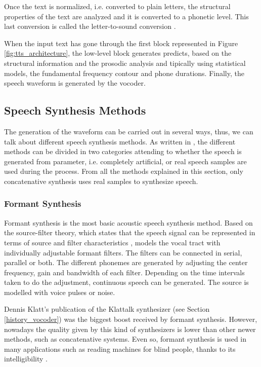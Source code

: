 Once the text is normalized, i.e. converted to plain letters, the structural properties of the text are analyzed and it is converted to a phonetic level. This last conversion is called the letter-to-sound conversion \cite{Pickett1999}. 

When the input text has gone through the first block represented in Figure \ref{fig:tts_architecture}, the low-level block generates predicts, based on the structural information and the prosodic analysis and tipically using statistical models, the fundamental frequency contour and phone durations. Finally, the speech waveform is generated by the vocoder. 

\subsection{Speech Synthesis Methods}
\label{speech_synthesis_systems_methods}
The generation of the waveform can be carried out in several ways, thus, we can talk about different speech synthesis methods. As written in \cite{TuomoMSc}, the different methods can be divided in two categories attending to whether the speech is generated from parameter, i.e. completely artificial, or real speech samples are used during the process. From all the methods explained in this section, only concatenative synthesis uses real samples to synthesize speech.

\subsubsection{Formant Synthesis}
\label{formant_speech_synthesis}
Formant synthesis is the most basic acoustic speech synthesis method. Based on the source-filter theory, which states that the speech signal can be represented in terms of source and filter characteristics \cite{Fant1970}, models the vocal tract with individually adjustable formant filters. The filters can be connected in serial, parallel or both. The different phonemes are generated by adjusting the center frequency, gain and bandwidth of each filter. Depending on the time intervals taken to do the adjustment, continuous speech can be generated. The source is modelled with voice pulses or noise.

Dennis Klatt's publication of the Klattalk synthesizer (see Section \ref{history_vocoder}) was the biggest boost received by formant synthesis. However, nowadays the quality given by this kind of synthesizers is lower than other newer methods, such as concatenative systems. Even so, formant synthesis is used in many applications such as reading machines for blind people, thanks to its intelligibility \cite{Pickett1999}.

